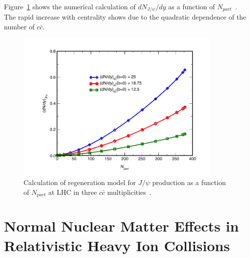 Figure~\ref{fig_2_reco} shows the numerical calculation of $dN_{J/\psi}/dy$ as a function of $N_{part}$~\cite{bib_yellowpaper}.
The rapid increase with centrality shows due to the quadratic dependence of the number of $c\bar{c}$. 
\begin{figure}[!h]
  \centering
  \includegraphics[width=10cm]{chap2/figure/reco/recoestimate.png}
  \caption{
	Calculation of regeneration model for $J/\psi$ production as a function of $N_{part}$ at LHC in three $c\bar{c}$ multiplicities~\cite{bib_yellowpaper}. 
	}
  \label{fig_2_reco}
\end{figure}

\section{Normal Nuclear Matter Effects in Relativistic Heavy Ion Collisions}
\label{sec_2_normal}

